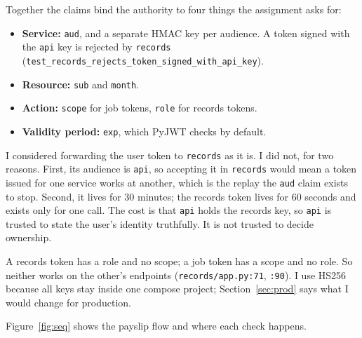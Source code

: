 \documentclass[11pt,a4paper]{article}
\newcommand{\file}[1]{\nolinkurl{#1}}
\newcommand{\test}[1]{\nolinkurl{#1}}
\begin{document}
Together the claims bind the authority to four things the assignment asks for:
\begin{itemize}
  \item \textbf{Service:} \texttt{aud}, and a separate HMAC key per audience. A token signed with the \texttt{api} key is rejected by \texttt{records} (\test{test_records_rejects_token_signed_with_api_key}).
  \item \textbf{Resource:} \texttt{sub} and \texttt{month}.
  \item \textbf{Action:} \texttt{scope} for job tokens, \texttt{role} for records tokens.
  \item \textbf{Validity period:} \texttt{exp}, which PyJWT checks by default.
\end{itemize}

I considered forwarding the user token to \texttt{records} as it is. I did not, for two reasons. First, its audience is \texttt{api}, so accepting it in \texttt{records} would mean a token issued for one service works at another, which is the replay the \texttt{aud} claim exists to stop. Second, it lives for 30 minutes; the records token lives for 60 seconds and exists only for one call. The cost is that \texttt{api} holds the records key, so \texttt{api} is trusted to state the user's identity truthfully. It is not trusted to decide ownership.

A records token has a role and no scope; a job token has a scope and no role. So neither works on the other's endpoints (\file{records/app.py:71}, \file{:90}). I use HS256 because all keys stay inside one compose project; Section~\ref{sec:prod} says what I would change for production.

Figure~\ref{fig:seq} shows the payslip flow and where each check happens.
\end{document}
